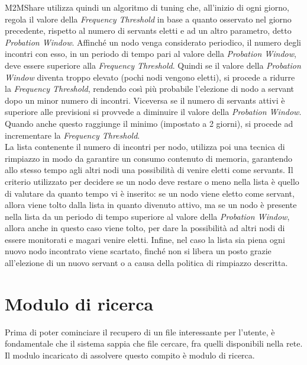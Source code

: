 M2MShare utilizza quindi un algoritmo di tuning che, all'inizio di ogni giorno, regola il valore della \textit{Frequency Threshold} in base a quanto osservato nel giorno precedente, rispetto al numero di servants eletti e ad un altro parametro, detto \textit{Probation Window}. Affinché un nodo venga considerato periodico, il numero degli incontri con esso, in un periodo di tempo pari al valore della \textit{Probation Window}, deve essere superiore alla \textit{Frequency Threshold}. Quindi se il valore della \textit{Probation Window} diventa troppo elevato (pochi nodi vengono eletti), si procede a ridurre la \textit{Frequency Threshold}, rendendo così più probabile l'elezione di nodo a servant dopo un minor numero di incontri. Viceversa se il numero di servants attivi è superiore alle previsioni si provvede a diminuire il valore della \textit{Probation Window}. Quando anche questo raggiunge il minimo (impostato a 2 giorni), si procede ad incrementare la \textit{Frequency Threshold}.
\\

La lista contenente il numero di incontri per nodo, utilizza poi una tecnica di rimpiazzo in modo da garantire un consumo contenuto di memoria, garantendo allo stesso tempo agli altri nodi una possibilità di venire eletti come servants. Il criterio utilizzato per decidere se un nodo deve restare o meno nella lista è quello di valutare da quanto tempo vi è inserito: se un nodo viene eletto come servant, allora viene tolto dalla lista in quanto divenuto attivo, ma se un nodo è presente nella lista da un periodo di tempo superiore al valore della \textit{Probation Window}, allora anche in questo caso viene tolto, per dare la possibilità ad altri nodi di essere monitorati e magari venire eletti. Infine, nel caso la lista sia piena ogni nuovo nodo incontrato viene scartato, finché non si libera un posto grazie all'elezione di un nuovo servant o a causa della politica di rimpiazzo descritta.

\section{Modulo di ricerca}
Prima di poter cominciare il recupero di un file interessante per l'utente, \`{e} fondamentale che il sistema sappia che file cercare, fra quelli disponibili nella rete. Il modulo incaricato di assolvere questo compito \`{e} modulo di ricerca.
\\

